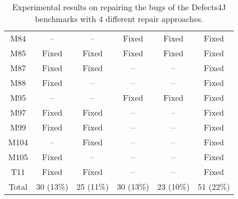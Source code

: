 \begin{table}[!t]
{\begin{tabular}{|c|c|c|c|c|c|}
M84               & --        & --        & Fixed     & Fixed     &Fixed   \\
M85               & Fixed     & Fixed     & Fixed     & Fixed     &Fixed   \\
M87               & Fixed     & Fixed     & --        & --        &Fixed   \\
M88               & Fixed     & --        & --        & --        &Fixed   \\
M95               & --        & --        & Fixed     & Fixed     &Fixed   \\
M97               & Fixed     & Fixed     & --        & --        &Fixed   \\
M99               & Fixed     & Fixed     & --        & --        &Fixed   \\
M104              & --        & Fixed     & --        & --        &Fixed   \\
M105              & Fixed     & --        & --        & --        &Fixed   \\
\hline
T11               & Fixed     & Fixed     & --        & --        &Fixed   \\
\hline
Total             & 30 (13\%) & 25 (11\%) & 30 (13\%) & 23 (10\%) & 51 (22\%)\\
\hline 
\end{tabular}%
}
\caption{Experimental results on repairing the bugs of the Defects4J benchmarks with 4 different repair approaches.}
\end{table}

